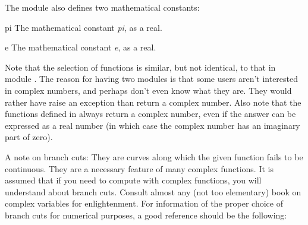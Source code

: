 The module also defines two mathematical constants:

\begin{datadesc}{pi}
The mathematical constant \emph{pi}, as a real.
\end{datadesc}

\begin{datadesc}{e}
The mathematical constant \emph{e}, as a real.
\end{datadesc}

Note that the selection of functions is similar, but not identical, to
that in module .  The reason for having
two modules is that some users aren't interested in complex numbers,
and perhaps don't even know what they are.  They would rather have
 raise an exception than return a complex number.
Also note that the functions defined in  always return a
complex number, even if the answer can be expressed as a real number
(in which case the complex number has an imaginary part of zero).

A note on branch cuts: They are curves along which the given function
fails to be continuous.  They are a necessary feature of many complex
functions.  It is assumed that if you need to compute with complex
functions, you will understand about branch cuts.  Consult almost any
(not too elementary) book on complex variables for enlightenment.  For
information of the proper choice of branch cuts for numerical
purposes, a good reference should be the following:

\begin{seealso}
\end{seealso}
